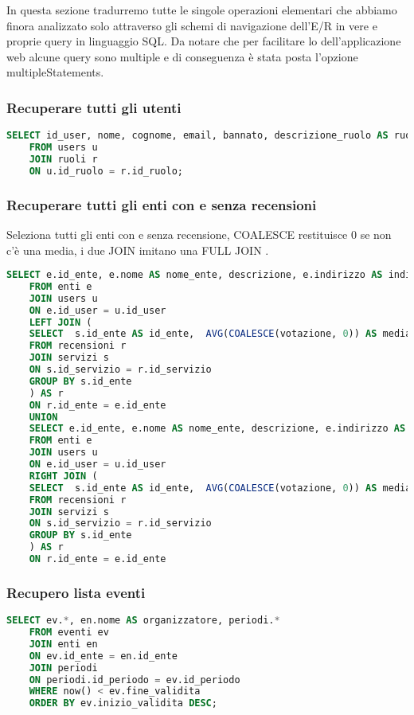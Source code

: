 In questa sezione tradurremo tutte le singole operazioni elementari che abbiamo finora analizzato solo
attraverso gli schemi di navigazione dell’E/R in vere e proprie query in linguaggio SQL. 
Da notare che per facilitare lo dell'applicazione web alcune query sono multiple e di conseguenza è stata posta l'opzione multipleStatements.


\subsubsection{Recuperare tutti gli utenti}

\begin{lstlisting}[language=SQL]
	SELECT id_user, nome, cognome, email, bannato, descrizione_ruolo AS ruolo
	FROM users u
	JOIN ruoli r 
	ON u.id_ruolo = r.id_ruolo;
\end{lstlisting}

\subsubsection{Recuperare tutti gli enti con e senza recensioni}
Seleziona tutti gli enti con e senza recensione, COALESCE restituisce 0 se non c'è una media, i due JOIN imitano una FULL JOIN .
\begin{lstlisting}[language=SQL]
	SELECT e.id_ente, e.nome AS nome_ente, descrizione, e.indirizzo AS indirizzo_ente, numero_telefono, e.id_user, u.nome AS nome_user, cognome, email, cf, telefono, id_ruolo, media_recensioni
	FROM enti e
	JOIN users u
	ON e.id_user = u.id_user
	LEFT JOIN (
	SELECT  s.id_ente AS id_ente,  AVG(COALESCE(votazione, 0)) AS media_recensioni
	FROM recensioni r
	JOIN servizi s
	ON s.id_servizio = r.id_servizio
	GROUP BY s.id_ente
	) AS r
	ON r.id_ente = e.id_ente 
	UNION
	SELECT e.id_ente, e.nome AS nome_ente, descrizione, e.indirizzo AS indirizzo_ente, numero_telefono, e.id_user, u.nome AS nome_user, cognome, email, cf, telefono, id_ruolo, media_recensioni
	FROM enti e
	JOIN users u
	ON e.id_user = u.id_user
	RIGHT JOIN (
	SELECT  s.id_ente AS id_ente,  AVG(COALESCE(votazione, 0)) AS media_recensioni
	FROM recensioni r
	JOIN servizi s
	ON s.id_servizio = r.id_servizio
	GROUP BY s.id_ente
	) AS r
	ON r.id_ente = e.id_ente
\end{lstlisting}


\subsubsection{Recupero lista eventi}
\begin{lstlisting}[language=SQL]
	SELECT ev.*, en.nome AS organizzatore, periodi.*
	FROM eventi ev
	JOIN enti en
	ON ev.id_ente = en.id_ente
	JOIN periodi
	ON periodi.id_periodo = ev.id_periodo
	WHERE now() < ev.fine_validita
	ORDER BY ev.inizio_validita DESC;
\end{lstlisting}

